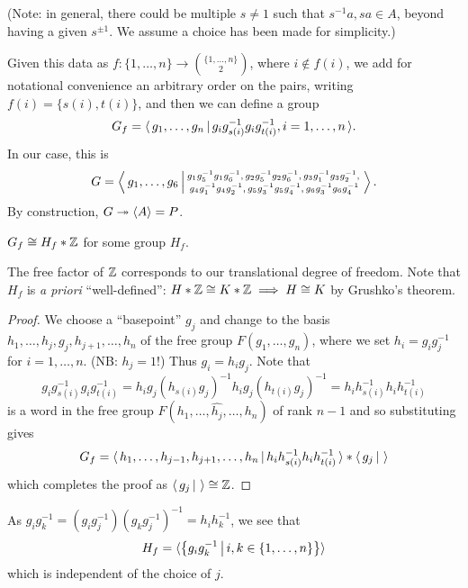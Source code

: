 (Note: in general, there could be multiple $s \neq 1$ such that $s^{-1} a, s a \in A$, beyond having a given $s^{\pm 1}$.
We assume a choice has been made for simplicity.)

Given this data as $f \colon \{1, \dots, n\} \to \binom{\{1, \dots, n\}}{2}$, where $i \notin f(i)$, we add for notational convenience an arbitrary order on the pairs, writing $f(i) = \{s(i), t(i)\}$, and then we can define a group \[
    G_f = \langle \, g_1, \dots, g_n \, | \,  g_i g_{s(i)}^{-1} g_i g_{t(i)}^{-1}, i = 1, \dots, n \, \rangle.
\]
In our case, this is \[
    G = \left\langle \, g_1, \dots, g_6 \, \middle| \, 
        \substack{
            g_1 g_5^{-1} g_1 g_6^{-1}, \,
            g_2 g_5^{-1} g_2 g_6^{-1}, \,
            g_3 g_1^{-1} g_3 g_2^{-1}, \, \\
            g_4 g_1^{-1} g_4 g_2^{-1}, \,
            g_5 g_3^{-1} g_5 g_4^{-1}, \,
            g_6 g_3^{-1} g_6 g_4^{-1}
        }
     \, \right\rangle.
\]
By construction, $G \twoheadrightarrow \langle A \rangle = P$.

\begin{lemma}
    $G_f \cong H_f * \mathbb{Z}$ for some group $H_f$.
\end{lemma}

The free factor of $\mathbb{Z}$ corresponds to our translational degree of freedom.
Note that $H_f$ is \emph{a priori} ``well-defined'': $H * \mathbb{Z} \cong K * \mathbb{Z} \implies H \cong K$ by Grushko's theorem.

\begin{proof}
    We choose a ``basepoint'' $g_j$ and change to the basis $h_1, \dots, h_j, g_j, h_{j+1}, \dots, h_n$ of the free group $F(g_1, \dots, g_n)$, where we set $h_i = g_i g_j^{-1}$ for $i = 1, \dots, n$.
    (NB: $h_j = 1$!)
    Thus $g_i = h_i g_j$.
    Note that \[
        g_i g_{s(i)}^{-1} g_i g_{t(i)}^{-1}
        =
        h_i g_j (h_{s(i)} g_j)^{-1} h_i g_j (h_{t(i)} g_j)^{-1}
        =
        h_i h_{s(i)}^{-1} h_i h_{t(i)}^{-1}
    \] is a word in the free group $F(h_1, \dots, \widehat{h_j}, \dots, h_n)$ of rank $n-1$ and so substituting gives \[
        G_f = \langle \, h_1, \dots, h_{j-1}, h_{j+1}, \dots, h_n \, | \, h_i h_{s(i)}^{-1} h_i h_{t(i)}^{-1} \, \rangle * \langle \, g_j \, | \,  \, \rangle
    \]
    which completes the proof as $\langle \, g_j \, | \,  \, \rangle \cong \mathbb{Z}$.
\end{proof}

\begin{remark}
    As $g_i g_k^{-1} = (g_i g_j^{-1}) (g_k g_j^{-1})^{-1} = h_i h_k^{-1}$, we see that \[
        H_f = \langle \left\{ g_i g_k^{-1} \,\middle|\,  i, k \in \{1, \dots, n\}  \right\} \rangle
    \] which is independent of the choice of $j$.
\end{remark}

